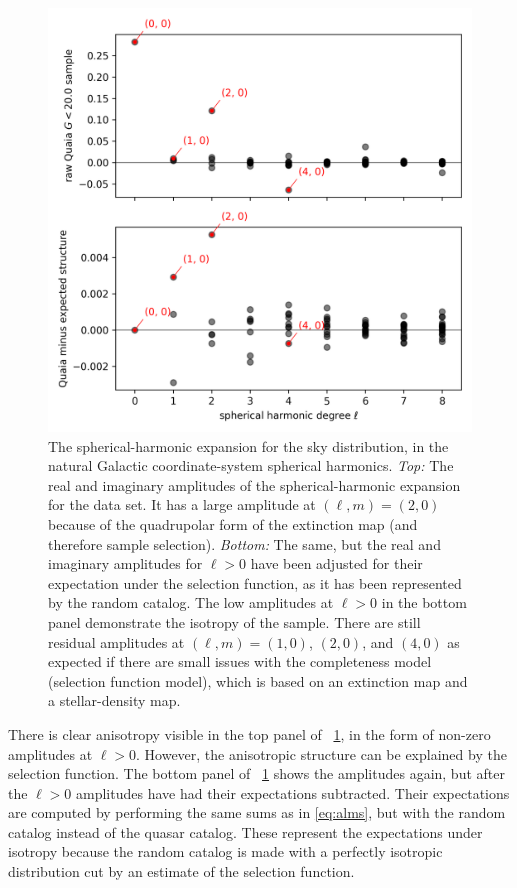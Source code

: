 \documentclass[modern]{aastex631}
\newlength{\figurewidth}
\newcommand{\figref}[1]{\figurename~\ref{#1}}
\begin{document}
\begin{figure}[t!]
  \begin{mdframed}
  \color{captiongray}
  \begin{center}
    \includegraphics[width=\figurewidth]{notebooks/alms.png}
  \end{center}
    \caption{The spherical-harmonic expansion for the sky distribution, in the natural Galactic coordinate-system spherical harmonics. \textsl{Top:} The real and imaginary amplitudes of the spherical-harmonic expansion for the data set. It has a large amplitude at $(\ell,m)=(2,0)$ because of the quadrupolar form of the extinction map (and therefore sample selection). \textsl{Bottom:} The same, but the real and imaginary amplitudes for $\ell>0$ have been adjusted for their expectation under the selection function, as it has been represented by the random catalog. The low amplitudes at $\ell>0$ in the bottom panel demonstrate the isotropy of the sample. There are still residual amplitudes at $(\ell, m)=(1,0)$, $(2,0)$, and $(4,0)$ as expected if there are small issues with the completeness model (selection function model), which is based on an extinction map and a stellar-density map.\label{fig:alms}}
  \end{mdframed}
\end{figure}
There is clear anisotropy visible in the top panel of \figref{fig:alms}, in the form of non-zero amplitudes at $\ell>0$.
However, the anisotropic structure can be explained by the selection function.
The bottom panel of \figref{fig:alms} shows the amplitudes again, but after the $\ell>0$ amplitudes have had their expectations subtracted.
Their expectations are computed by performing the same sums as in \eqref{eq:alms}, but with the random catalog instead of the quasar catalog.
These represent the expectations under isotropy because the random catalog is made with a perfectly isotropic distribution cut by an estimate of the selection function.
\end{document}
